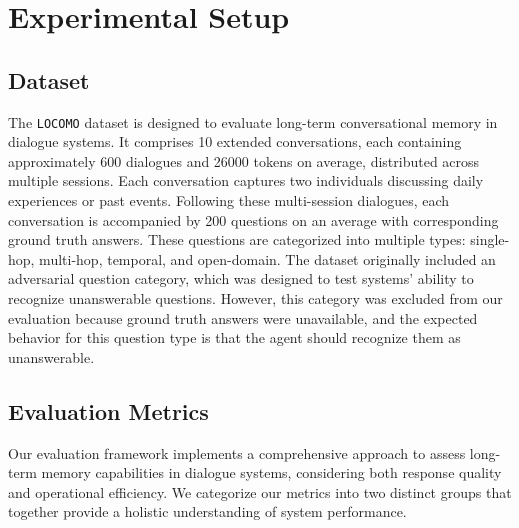 \section{Experimental Setup}
\label{sec:experiment_setup}


\subsection{Dataset}
The \texttt{LOCOMO} \citep{maharana2024evaluating} dataset is designed to evaluate long-term conversational memory in dialogue systems. It comprises 10 extended conversations, each containing approximately 600 dialogues and 26000 tokens on average, distributed across multiple sessions. Each conversation captures two individuals discussing daily experiences or past events. Following these multi-session dialogues, each conversation is accompanied by 200 questions on an average with corresponding ground truth answers. These questions are categorized into multiple types: single-hop, multi-hop, temporal, and open-domain. The dataset originally included an adversarial question category, which was designed to test systems' ability to recognize unanswerable questions. However, this category was excluded from our evaluation because ground truth answers were unavailable, and the expected behavior for this question type is that the agent should recognize them as unanswerable.

\subsection{Evaluation Metrics}
Our evaluation framework implements a comprehensive approach to assess long-term memory capabilities in dialogue systems, considering both response quality and operational efficiency. We categorize our metrics into two distinct groups that together provide a holistic understanding of system performance.

